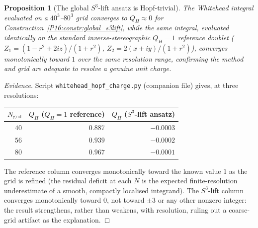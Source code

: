 \documentclass[11pt,a4paper]{article}
\newtheorem{proposition}[theorem]{Proposition}
\theoremstyle{definition}\newtheorem{definition}[theorem]{Definition}
\theoremstyle{remark}
\theoremstyle{definition}\newtheorem{construction}[theorem]{Construction}
\newcommand{\QH}{Q_H}
\begin{document}
\begin{proposition}[The global $S^3$-lift ansatz is Hopf-trivial]
\label{P16:prop:s3lift_charge_zero}
The Whitehead integral evaluated on a $40^3$--$80^3$ grid converges
to $\QH\approx0$ for Construction~\ref{P16:constr:global_s3lift}, while
the same integral, evaluated identically on the standard
inverse-stereographic $\QH=1$ reference doublet
($Z_1=(1-r^2+2iz)/(1+r^2)$, $Z_2=2(x+iy)/(1+r^2)$), converges
monotonically toward $1$ over the same resolution range, confirming
the method and grid are adequate to resolve a genuine unit charge.
\end{proposition}

\begin{proof}[Evidence]
Script \texttt{whitehead\_hopf\_charge.py} (companion file) gives, at
three resolutions:
\begin{center}
\renewcommand{\arraystretch}{1.2}
\begin{tabular}{rrr}
\toprule
$N_{\mathrm{grid}}$ & $\QH$ ($\QH=1$ reference) & $\QH$ ($S^3$-lift ansatz) \\
\midrule
$40$ & $0.887$ & $-0.0003$ \\
$56$ & $0.939$ & $-0.0002$ \\
$80$ & $0.967$ & $-0.0001$ \\
\bottomrule
\end{tabular}
\end{center}
The reference column converges monotonically toward the known value
$1$ as the grid is refined (the residual deficit at each $N$ is the
expected finite-resolution underestimate of a smooth, compactly
localised integrand). The $S^3$-lift column converges monotonically
toward $0$, not toward $\pm3$ or any other nonzero integer: the
result strengthens, rather than weakens, with resolution, ruling out
a coarse-grid artifact as the explanation.
\end{proof}
\end{document}
